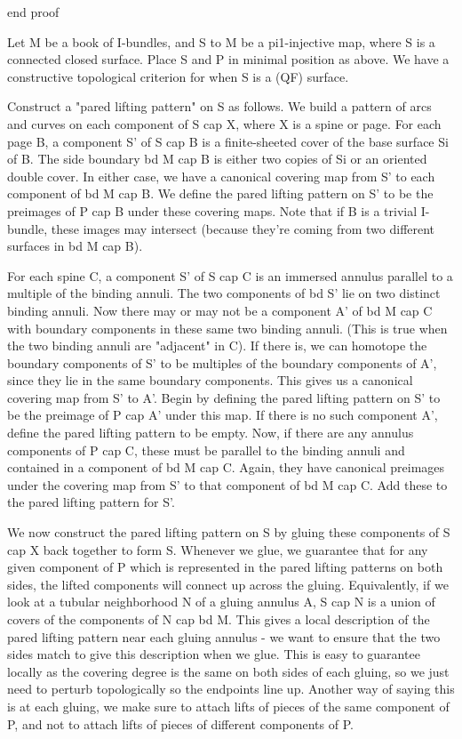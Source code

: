 end proof

Let M be a book of I-bundles, and S to M be a pi1-injective map, where S is
a connected closed surface.  Place S and P in minimal position as above. We
have a constructive topological criterion for when S is a (QF) surface.

Construct a "pared lifting pattern" on S as follows. We build a pattern of arcs
and curves on each component of S cap X, where X is a spine or page. For each
page B, a component S' of S cap B is a finite-sheeted cover of the base surface
Si of B. The side boundary bd M cap B is either two copies of Si or an oriented
double cover. In either case, we have a canonical covering map from S' to each
component of bd M cap B. We define the pared lifting pattern on S' to be the
preimages of P cap B under these covering maps. Note that if B is a trivial
I-bundle, these images may intersect (because they're coming from two different
surfaces in bd M cap B).

For each spine C, a component S' of S cap C is an immersed annulus parallel to
a multiple of the binding annuli.  The two components of bd S' lie on two
distinct binding annuli. Now there may or may not be a component A' of bd M cap
C with boundary components in these same two binding annuli. (This is true when
the two binding annuli are "adjacent" in C). If there is, we can homotope the
boundary components of S' to be multiples of the boundary components of A',
since they lie in the same boundary components. This gives us a canonical
covering map from S' to A'. Begin by defining the pared lifting pattern on S' to
be the preimage of P cap A' under this map. If there is no such component A',
define the pared lifting pattern to be empty. Now, if there are any annulus
components of P cap C, these must be parallel to the binding annuli and
contained in a component of bd M cap C.  Again, they have canonical preimages
under the covering map from S' to that component of bd M cap C. Add these to
the pared lifting pattern for S'.

We now construct the pared lifting pattern on S by gluing these components of
S cap X back together to form S. Whenever we glue, we guarantee that for any
given component of P which is represented in the pared lifting patterns on both
sides, the lifted components will connect up across the gluing.  Equivalently,
if we look at a tubular neighborhood N of a gluing annulus A, S cap N is
a union of covers of the components of N cap bd M. This gives a local
description of the pared lifting pattern near each gluing annulus - we want to
ensure that the two sides match to give this description when we glue. This is
easy to guarantee locally as the covering degree is the same on both sides of
each gluing, so we just need to perturb topologically so the endpoints line up.
Another way of saying this is at each gluing, we make sure to attach lifts of
pieces of the same component of P, and not to attach lifts of pieces of
different components of P.

